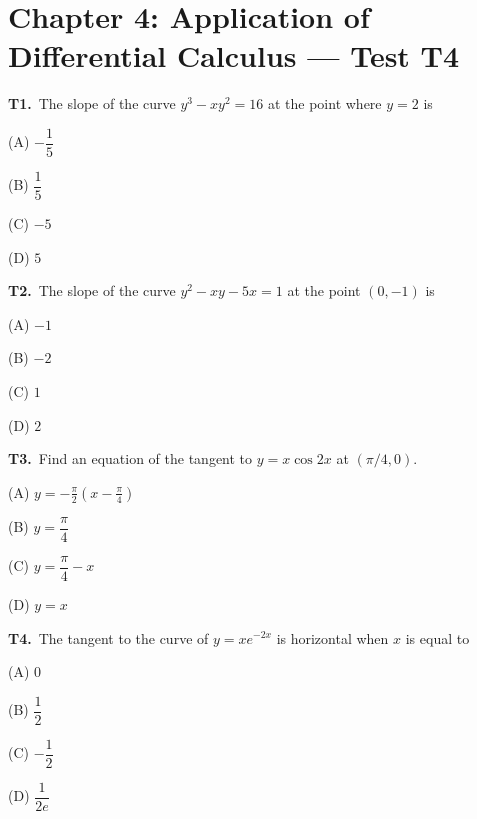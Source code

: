 \documentclass[11pt]{article}
\begin{document}
\section*{Chapter 4: Application of Differential Calculus --- Test T4}

\bigskip\noindent\textbf{T1.}\ The slope of the curve $y^3 - xy^2 = 16$ at the point where $y=2$ is
\begin{list}{}{\setlength{\leftmargin}{3em}\setlength{\labelwidth}{2.5em}\setlength{\itemsep}{0pt}\setlength{\topsep}{2pt}}
\item[(A)] $-\dfrac{1}{5}$
\item[(B)] $\dfrac{1}{5}$
\item[(C)] $-5$
\item[(D)] $5$
\end{list}

\bigskip\noindent\textbf{T2.}\ The slope of the curve $y^2 - xy - 5x = 1$ at the point $(0,-1)$ is
\begin{list}{}{\setlength{\leftmargin}{3em}\setlength{\labelwidth}{2.5em}\setlength{\itemsep}{0pt}\setlength{\topsep}{2pt}}
\item[(A)] $-1$
\item[(B)] $-2$
\item[(C)] $1$
\item[(D)] $2$
\end{list}

\bigskip\noindent\textbf{T3.}\ Find an equation of the tangent to $y=x\cos2x$ at $(\pi/4,0)$.
\begin{list}{}{\setlength{\leftmargin}{3em}\setlength{\labelwidth}{2.5em}\setlength{\itemsep}{0pt}\setlength{\topsep}{2pt}}
\item[(A)] $y=-\frac\pi2(x-\frac\pi4)$
\item[(B)] $y = \dfrac{\pi}{4}$
\item[(C)] $y = \dfrac{\pi}{4} - x$
\item[(D)] $y = x$
\end{list}

\bigskip\noindent\textbf{T4.}\ The tangent to the curve of $y = xe^{-2x}$ is horizontal when $x$ is equal to
\begin{list}{}{\setlength{\leftmargin}{3em}\setlength{\labelwidth}{2.5em}\setlength{\itemsep}{0pt}\setlength{\topsep}{2pt}}
\item[(A)] $0$
\item[(B)] $\dfrac{1}{2}$
\item[(C)] $-\dfrac{1}{2}$
\item[(D)] $\dfrac{1}{2e}$
\end{list}
\end{document}
